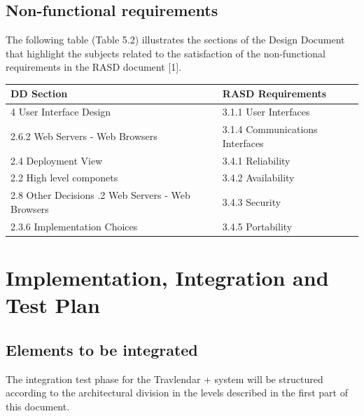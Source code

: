 \documentclass{article}
\begin{document}
\begin{center}
\begin{tabular}{|p{}|p{}|p{}|}
			\hline
		\end{tabular}
	\end{center}


	\subsection{Non-functional requirements}
	The following table (Table 5.2) illustrates the sections of the Design Document that highlight the subjects related to the satisfaction of the non-functional requirements in the RASD document [1].

	\begin{center}

		\bigskip
		\begin{tabular}{|p{}|p{}|}
			\hline
			\textbf{DD Section} & \textbf{RASD Requirements} \\
			\hline
			4 User Interface Design & 3.1.1 User Interfaces \\
			\hline
			2.6.2 Web Servers - Web Browsers & 3.1.4 Communications Interfaces \\
			\hline
			2.4 Deployment View & 3.4.1 Reliability \\
			\hline
			2.2 High level componets & 3.4.2 Availability \\
			\hline
			2.8 Other Decisions \newline 2.6.2 Web Servers - Web Browsers & 3.4.3 Security \\
			\hline
			2.3.6 Implementation Choices & 3.4.5 Portability \\
			\hline
		\end{tabular}
	\end{center}


	\section{Implementation, Integration and Test Plan}


	\subsection{Elements to be integrated}
	The integration test phase for the Travlendar + system will be structured according to the architectural division in the levels described in the first part of this document.
	
\end{document}
